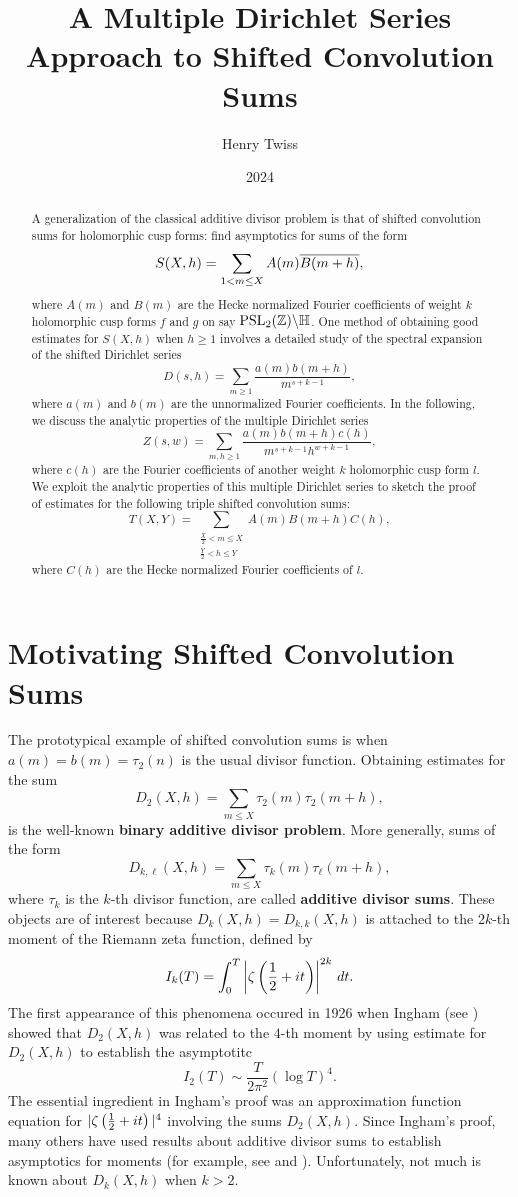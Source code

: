 \documentclass[12pt,reqno,oneside]{amsart}
\title{A Multiple Dirichlet Series Approach to Shifted Convolution Sums}
\author{Henry Twiss}
\date{2024}
\begin{document}
\begin{abstract}
  A generalization of the classical additive divisor problem is that of shifted convolution sums for holomorphic cusp forms: find asymptotics for sums of the form
  \[
    S(X,h) = \sum_{1 < m \le X}A(m)\overline{B(m+h)},
  \]
  where $A(m)$ and $B(m)$ are the Hecke normalized Fourier coefficients of weight $k$ holomorphic cusp forms $f$ and $g$ on say $\mathrm{PSL}_{2}(\mathbb{Z})\backslash\mathbb{H}$. One method of obtaining good estimates for $S(X,h)$ when $h \ge 1$ involves a detailed study of the spectral expansion of the shifted Dirichlet series
  \[
    D(s,h) = \sum_{m \ge 1}\frac{a(m)b(m+h)}{m^{s+k-1}},
  \]
  where $a(m)$ and $b(m)$ are the unnormalized Fourier coefficients. In the following, we discuss the analytic properties of the multiple Dirichlet series
  \[
    Z(s,w) = \sum_{m,h \ge 1}\frac{a(m)b(m+h)c(h)}{m^{s+k-1}h^{w+k-1}},
  \]
  where $c(h)$ are the Fourier coefficients of another weight $k$ holomorphic cusp form $l$. We exploit the analytic properties of this multiple Dirichlet series to sketch the proof of estimates for the following triple shifted convolution sums:
  \[
    T(X,Y) = \sum_{\substack{\frac{X}{2} < m \le X \\ \frac{Y}{2} < h \le Y}}A(m)B(m+h)C(h),
  \]
  where $C(h)$ are the Hecke normalized Fourier coefficients of $l$.
\end{abstract}

\maketitle

\section{Motivating Shifted Convolution Sums}
  The prototypical example of shifted convolution sums is when $a(m) = b(m) = \tau_{2}(n)$ is the usual divisor function. Obtaining estimates for the sum
  \[
    D_{2}(X,h) = \sum_{m \le X}\tau_{2}(m)\tau_{2}(m+h),
  \]
  is the well-known \textbf{binary additive divisor problem}. More generally, sums of the form
  \[
    D_{k,\ell}(X,h) = \sum_{m \le X}\tau_{k}(m)\tau_{\ell}(m+h),
  \]
  where $\tau_{k}$ is the $k$-th divisor function, are called \textbf{additive divisor sums}. These objects are of interest because $D_{k}(X,h) = D_{k,k}(X,h)$ is attached to the $2k$-th moment of the Riemann zeta function, defined by
  \[
    I_{k}(T) = \int_{0}^{T}\left|\zeta\left(\frac{1}{2}+it\right)\right|^{2k}\,dt.
  \]
  The first appearance of this phenomena occured in 1926 when Ingham (see \cite{I}) showed that $D_{2}(X,h)$ was related to the $4$-th moment by using estimate for $D_{2}(X,h)$ to establish the asymptotitc
  \[
    I_{2}(T) \sim \frac{T}{2\pi^{2}}(\log{T})^{4}. 
  \]
  The essential ingredient in Ingham's proof was an approximation function equation for $|\zeta\left(\frac{1}{2}+it\right)|^{4}$ involving the sums $D_{2}(X,h)$. Since Ingham's proof, many others have used results about additive divisor sums to establish asymptotics for moments (for example, see \cite{HB} and \cite{JM}). Unfortunately, not much is known about $D_{k}(X,h)$ when $k > 2$.
  
\end{document}
